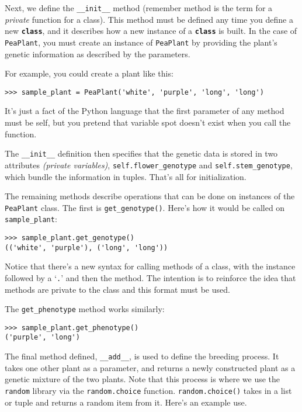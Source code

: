 Next, we define the \texttt{\_\_init\_\_} method (remember method is the term for a \emph{private} function for a class). This method must be defined any time you define a new \texttt{\textbf{class}}, and it describes how a new instance of a \texttt{\textbf{class}} is built. In the case of \texttt{PeaPlant}, you must create an instance of \texttt{PeaPlant} by providing the plant's genetic information as described by the parameters.

For example, you could create a plant like this:

\begin{lstlisting}[numbers=none]
>>> sample_plant = PeaPlant('white', 'purple', 'long', 'long')
\end{lstlisting}
 
It's just a fact of the Python language that the first parameter of any method must be self, but you pretend that variable spot doesn't exist when you call the function.

The \texttt{\_\_init\_\_} definition then specifies that the genetic data is stored in two attributes \emph{(private variables)}, \texttt{self.flower\_genotype} and \texttt{self.stem\_genotype}, which bundle the information in tuples. That's all for initialization.

The remaining methods describe operations that can be done on instances of the \texttt{PeaPlant} class. The first is \texttt{get\_genotype()}. Here's how it would be called on \texttt{sample\_plant}:

\begin{lstlisting}[numbers=none]
>>> sample_plant.get_genotype()
(('white', 'purple'), ('long', 'long'))
\end{lstlisting}

Notice that there's a new syntax for calling methods of a class, with the instance followed by a `\texttt{.}' and then the method. The intention is to reinforce the idea that methods are private to the class and this format must be used.

The \texttt{get\_phenotype} method works similarly:

\begin{lstlisting}[numbers=none]
>>> sample_plant.get_phenotype()
('purple', 'long')
\end{lstlisting}

The final method defined, \texttt{\_\_add\_\_}, is used to define the breeding process. It takes one other plant as a parameter, and returns a newly constructed plant as a genetic mixture of the two plants. Note that this process is where we use the \texttt{random} library via the \texttt{random.choice} function. \texttt{random.choice()} takes in a list or tuple and returns a random item from it. Here's an example use.

